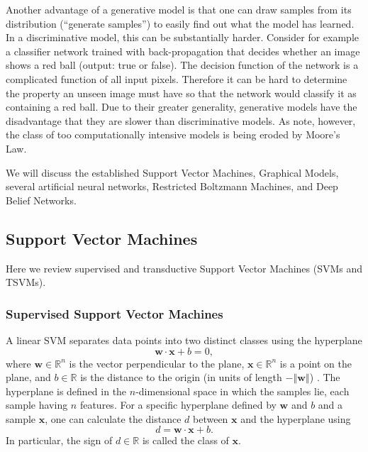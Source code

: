 Another advantage of a generative model is that one can draw samples
from its distribution (``generate samples'') to easily find out
what the model has learned. In a discriminative model, this can be
substantially harder. Consider for example a classifier network trained
with back-propagation that decides whether an image shows a red ball
(output: true or false). The decision function of the network is a
complicated function of all input pixels. Therefore it can be hard
to determine the property an unseen image must have so that the network
would classify it as containing a red ball. Due to their greater generality,
generative models have the disadvantage that they are slower than
discriminative models. As \cite{HintonTeh2006} note, however, the
class of too computationally intensive models is being eroded by Moore's
Law.

We will discuss the established Support Vector Machines, Graphical
Models, several artificial neural networks, Restricted Boltzmann Machines,
and Deep Belief Networks.

\subsection{Support Vector Machines}

Here we review supervised and transductive Support Vector Machines
(SVMs and TSVMs).

\subsubsection{Supervised Support Vector Machines}

A linear SVM separates data points into two
distinct classes using the hyperplane
\[
\mathbf{w}\cdot\mathbf{x}+b=0,
\]
 where $\mathbf{w}\in\mathbb{R}^{n}$ is the vector perpendicular
to the plane, $\mathbf{x}\in\mathbb{R}^{n}$ is a point on the plane,
and \textbf{$b\in\mathbb{R}$} is the distance to the origin (in units
of length $-\left\Vert \mathbf{w}\right\Vert $) \cite{StatnikovGuyon2011}.
The hyperplane is defined in the $n$-dimensional space in which the
samples lie, each sample having $n$ features. For a specific hyperplane
defined by $\mathbf{w}$ and $b$ and a sample $\mathbf{x}$, one
can calculate the distance $d$ between $\mathbf{x}$ and the hyperplane
using
\[
d=\mathbf{w}\cdot\mathbf{x}+b.
\]
In particular, the sign of $d\in\mathbb{R}$ is called the class of
$\mathbf{x}$.

